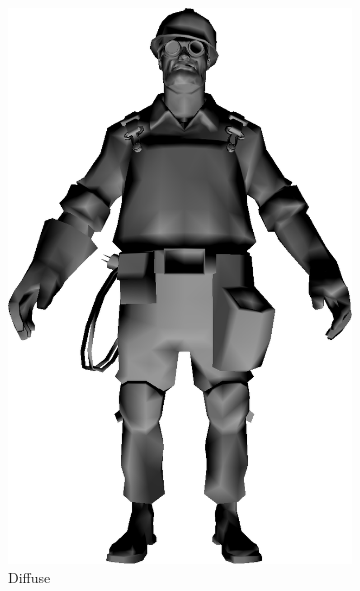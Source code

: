 \begin{figure}[h]
\begin{subfigure}[b]{0.18\textwidth}
        \includegraphics[width=\textwidth]{img/Lighting/diffuse.png}
        \caption{Diffuse}
        \label{fig:diffuse}
    \end{subfigure}
     ~
    \centering
    \begin{subfigure}[b]{0.18\textwidth}

\end{subfigure}
\end{figure}
